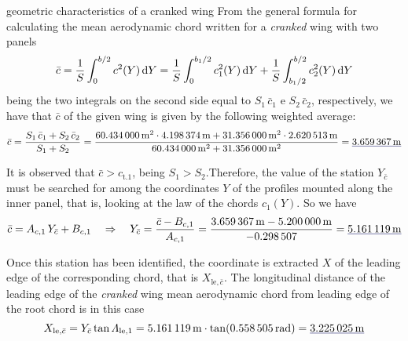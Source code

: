 \documentclass[[12pt,twoside]{book}
\begin{document}
\begin{myExampleX}{geometric characteristics of a cranked wing}{}
From the general formula for calculating the mean aerodynamic chord
written for a \emph{cranked} wing with two panels
\[
\bar{c} 
  = \frac{1}{S} \int_0^{b/2} c^2(Y) \mathop{}\!\mathrm{d}{Y} 
  = \frac{1}{S} \int_0^{b_1/2} c_1^2(Y) \mathop{}\!\mathrm{d}{Y} 
    + \frac{1}{S} \int_{b_1/2}^{b/2} c_2^2(Y) \mathop{}\!\mathrm{d}{Y}
\]
being the two integrals on the second side equal to $S_1 \, \bar{c}_1$ e $S_2 \, \bar{c}_2$, respectively,
we have that $\bar{c}$ of the given wing is given by the following weighted average:
\[
\bar{c} = \frac{S_1 \, \bar{c}_1 + S_2 \, \bar{c}_2} {S_1 + S_2}
  =
  \frac{\SI[round-precision=1]{\myAreaWingIMTsquared}{\metre^2} \cdot \SI[round-precision=2]{\myMACWingIMT}{\metre} + \SI[round-precision=1]{\myAreaWingIIMTsquared}{\metre^2} \cdot \SI[round-precision=2]{\myMACWingIIMT}{\metre}}{\SI[round-precision=1]{\myAreaWingIMTsquared}{\metre^2} + \SI[round-precision=1]{\myAreaWingIIMTsquared}{\metre^2}}
    = \mathunderline{mydarkblue}{ \SI[round-precision=2]{\myMACWingCrankedMT}{\metre} }
\]

It is observed that $\bar{c} > c_{\mathrm{t}.1}$, being $S_1>S_2$.Therefore,
the value of the station $Y_{\bar{c}}$ must be searched for among the coordinates $Y$ of the profiles mounted along the inner panel,
that is, looking at the law of the chords $c_1(Y)$.
So we have
\[
\bar{c}=A_{c,1}\,Y_{\bar{c}} + B_{c,1} \quad \Rightarrow \quad
  Y_{\bar{c}} 
    = \frac{\bar{c} - B_{c,1}}{A_{c,1}}
    = \frac{
      \SI[round-precision=2]{\myMACWingCrankedMT}{\metre} 
        - \SI[round-precision=2]{\myCoeffBChordWingIMT}{\metre}
      }{
        \SI[round-precision=3]{\myCoeffAChordWingI}{}
      }
    = \mathunderline{mydarkblue}{
      \SI[round-precision=2]{\myYYMACWingCrankedMT}{\metre}
    }
\]

Once this station has been identified, the coordinate is extracted $X$ of the leading edge
of the corresponding chord, that is $X_{\mathrm{le},\bar{c}}$.
The longitudinal distance of the leading edge of the \emph{cranked} wing mean aerodynamic chord  from
leading edge of the root chord is in this case
\[
X_{\mathrm{le},\bar{c}} 
  = Y_{\bar{c}} \tan \Lambda_{\mathrm{le},1}
  = \SI[round-precision=2]{\myYYMACWingCrankedMT}{\metre}
    \cdot \tan( \SI[round-precision=3]{\mySweepLEWingIRAD}{\radian} )
  = \mathunderline{mydarkblue}{ \SI[round-precision=2]{\myXXMACLEToApexWingCrankedMT}{\metre} }
\]


\end{myExampleX}
\end{document}
